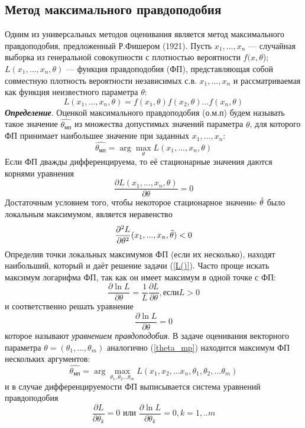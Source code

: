 \subsection{Метод максимального правдоподобия}
\noindent Одним из универсальных методов оценивания является метод максимального правдоподобия, предложенный Р.Фишером (1921).
Пусть $x_{1},...,x_{n}$ — случайная выборка из генеральной совокупности с плотностью вероятности $f(x,\theta$); $L(x_{1},... ,x_{n}, \theta)$ — функция правдоподобия (ФП), представляющая собой совместную плотность вероятности независимых с.в. $x_{1}, ... ,x_{n}$ и рассматриваемая как функция неизвестного параметра $\theta$:
\begin{equation}
L(x_{1},...,x_{n},\theta) = f(x_{1},\theta)f(x_{2},\theta)...f(x_{n}, \theta)
\label{L()}
\end{equation}
\textbf{\textit{Определение}}. Оценкой максимального правдоподобия (о.м.п) будем называть такое значение $\hat{\theta_{мп}}$ из множества допустимых значений параметра $\theta$, для которого ФП принимает наибольшее значение при заданных $x_{1},...,x_{n}$:
\begin{equation}
\hat{\theta_{мп}} = \arg \max_{\theta}L(x_{1},...,x_{n},\theta)
\label{theta_mp}
\end{equation}
Если ФП дважды дифференцируема, то её стационарные значения даются корнями уравнения
\begin{equation}
\frac{\partial L(x_{1},...,x_{n},\theta)}{\partial \theta} = 0
\label{eq_min}
\end{equation}
Достаточным условием того, чтобы некоторое стационарное значениe $\Tilde{\theta}$ было локальным максимумом, является неравенство
\begin{equation}
\frac{\partial^{2}L}{\partial \theta^{2}}(x_{1},...,x_{n},\Tilde{\theta}) < 0
\label{ineq_min}
\end{equation}
Определив точки локальных максимумов ФП (если их несколько), находят наибольший, который и даёт решение задачи (\ref{L()}).
Часто проще искать максимум логарифма ФП, так как он имеет максимум в одной точке с ФП:
\begin{equation}
\frac{\partial \ln L}{\partial \theta}=\frac{1}{L}\frac{\partial L}{\partial \theta}, если L > 0
\label{log_max}
\end{equation}
и соответственно решать уравнение
\begin{equation}
\frac{\partial \ln L}{\partial \theta}= 0
\label{log_m=0}
\end{equation}
которое называют \textit{уравнением правдоподобия}.
В задаче оценивания векторного параметра $\theta = (\theta_{1}, ... ,\theta_{m})$ аналогично (\ref{theta_mp}) находится максимум ФП нескольких аргументов: 
\begin{equation}
\hat{\theta_{мп}} = \arg \max_{\theta_{1}, \theta_{2}...\theta_{m}} L(x_{1}, x_{2},...x_{n}, \theta_{1}, \theta_{2},...\theta_{m})
\label{multi_theta}
\end{equation}
и в случае дифференцируемости ФП выписывается система уравнений правдоподобия
\begin{equation}
\frac{\partial L}{\partial \theta_{k}} = 0 \text{  или  } \frac{\partial \ln L}{\partial \theta_{k}} = 0, k = 1,..m
\end{equation}

